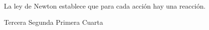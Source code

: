 
\question La \fillin \enspace ley de Newton establece que para cada acción
          hay una reacción.

  \begin{oneparchoices}
    \CorrectChoice Tercera
    \choice Segunda
    \choice Primera
    \choice Cuarta
  \end{oneparchoices}
